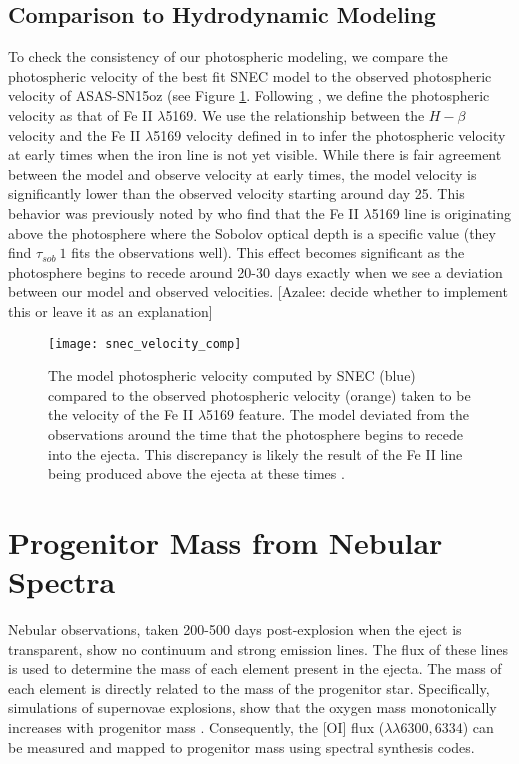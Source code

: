 \documentclass[preprint]{aastex61}
\newcommand{\azaleecomment}[1]{{\color{red} [{#1}]}}
\newcommand{\Azalee}[1]{\azaleecomment{Azalee: #1}}
\begin{document}
\subsection{Comparison to Hydrodynamic Modeling}
To check the consistency of our photospheric modeling, we compare the photospheric velocity of the best fit SNEC model to the observed photospheric velocity of ASAS-SN15oz (see Figure \ref{fig:SNECVelocityCompare}.
Following \citet{2014faran}, we define the photospheric velocity as that of Fe II $\lambda$5169. 
We use the relationship between the $H-\beta$ velocity and the Fe II $\lambda$5169 velocity defined in \citet{2014faran} to infer the photospheric velocity at early times when the iron line is not yet visible.
While there is fair agreement between the model and observe velocity at early times, the model velocity is significantly lower than the observed velocity starting around day 25.
This behavior was previously noted by \citet{2018paxton} who find that the Fe II $\lambda$5169 line is originating above the photosphere where the Sobolov optical depth is a specific value (they find $\tau_{sob} ~1$ fits the observations well). 
This effect becomes significant as the photosphere begins to recede around 20-30 days exactly when we see a deviation between our model and observed velocities. 
\Azalee{decide whether to implement this or leave it as an explanation}

\begin{figure}[htbp]
\begin{center}
\texttt{[image: snec\_velocity\_comp]}
\caption{The model photospheric velocity computed by SNEC (blue) compared to the observed photospheric velocity (orange) taken to be the velocity of the Fe II $\lambda$5169 feature. 
The model deviated from the observations around the time that the photosphere begins to recede into the ejecta.
This discrepancy is likely the result of the Fe II line being produced above the ejecta at these times \citep{2018paxton}.
}
\label{fig:SNECVelocityCompare}
\end{center}
\end{figure}
\section{Progenitor Mass from Nebular Spectra}
Nebular observations, taken 200-500 days post-explosion when the eject is transparent, show no continuum and strong emission lines. 
The flux of these lines is used to determine the mass of each element present in the ejecta.
The mass of each element is directly related to the mass of the progenitor star. 
Specifically, simulations of supernovae explosions, show that the oxygen mass monotonically increases with progenitor mass \citep{2007woosley}.
Consequently, the [OI] flux ($\lambda\lambda6300, 6334$) can be measured and mapped to progenitor mass using spectral synthesis codes.
\end{document}
